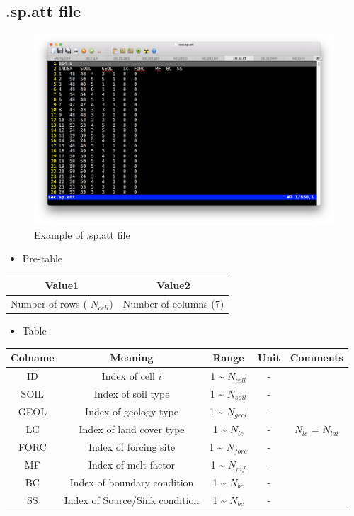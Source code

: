 \documentclass[]{scrbook}
\providecommand{\tightlist}{%
  \setlength{\itemsep}{0pt}\setlength{\parskip}{0pt}}
\begin{document}
\subsection{.sp.att file}\label{sp.att-file}

\begin{figure}
\centering
\includegraphics{Fig/IO/sp.att.png}
\caption{Example of .sp.att file}
\end{figure}

\begin{itemize}
\tightlist
\item
  Pre-table
\end{itemize}

\begin{longtable}[]{@{}cc@{}}
\toprule
Value1 & Value2\tabularnewline
\midrule
\endhead
Number of rows ( \(N_{cell}\)) & Number of columns
(\(7\))\tabularnewline
\bottomrule
\end{longtable}

\begin{itemize}
\tightlist
\item
  Table
\end{itemize}

\begin{longtable}[]{@{}ccccc@{}}
\toprule
Colname & Meaning & Range & Unit & Comments\tabularnewline
\midrule
\endhead
ID & Index of cell \(i\) & 1 \textasciitilde{} \(N_{cell}\) & -
&\tabularnewline
SOIL & Index of soil type & 1 \textasciitilde{} \(N_{soil}\) & -
&\tabularnewline
GEOL & Index of geology type & 1 \textasciitilde{} \(N_{geol}\) & -
&\tabularnewline
LC & Index of land cover type & 1 \textasciitilde{} \(N_{lc}\) & - &
\(N_{lc}\) = \(N_{lai}\)\tabularnewline
FORC & Index of forcing site & 1 \textasciitilde{} \(N_{forc}\) & -
&\tabularnewline
MF & Index of melt factor & 1 \textasciitilde{} \(N_{mf}\) & -
&\tabularnewline
BC & Index of boundary condition & 1 \textasciitilde{} \(N_{bc}\) & -
&\tabularnewline
SS & Index of Source/Sink condition & 1 \textasciitilde{} \(N_{bc}\) & -
&\tabularnewline
\bottomrule
\end{longtable}
\end{document}
